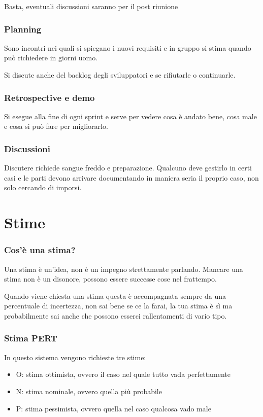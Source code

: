 \documentclass[11pt,a4paper]{book}
\begin{document}
Basta, eventuali discussioni saranno per il post riunione

\subsection{Planning}
Sono incontri nei quali si spiegano i nuovi requisiti e in gruppo si stima quando può richiedere in giorni uomo.

Si discute anche del backlog degli sviluppatori e se rifiutarle o continuarle.

\subsection{Retrospective e demo}
Si esegue alla fine di ogni sprint e serve per vedere cosa è andato bene, cosa male e cosa si può fare per migliorarlo.

\subsection{Discussioni}
Discutere richiede sangue freddo e preparazione. Qualcuno deve gestirlo in certi casi e le parti devono arrivare documentando in maniera seria il proprio caso, non solo cercando di imporsi.

\chapter{Stime}
\subsection{Cos'è una stima?}
Una stima è un'idea, non è un impegno strettamente parlando. Mancare una stima non è un disonore, possono essere successe cose nel frattempo.

Quando viene chiesta una stima questa è accompagnata sempre da una percentuale di incertezza, non sai bene se ce la farai, la tua stima è sì ma probabilmente sai anche che possono esserci rallentamenti di vario tipo.

\subsection{Stima PERT}
In questo sistema vengono richieste tre stime:
\begin{itemize}
	\item O: stima ottimista, ovvero il caso nel quale tutto vada perfettamente
	\item N: stima nominale, ovvero quella più probabile
	\item P: stima pessimista, ovvero quella nel caso qualcosa vado male
\end{itemize}
\end{document}
